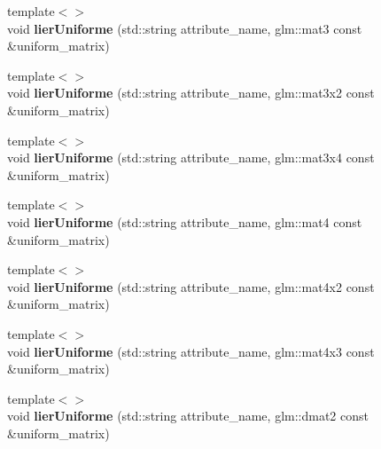 \begin{DoxyCompactItemize}
\item 
\hypertarget{classopengl_1_1_programme_a9fcb45e6142abed238e1e9fb7e4210f8}{{\footnotesize template$<$$>$ }\\void {\bfseries lier\-Uniforme} (std\-::string attribute\-\_\-name, glm\-::mat3 const \&uniform\-\_\-matrix)}\label{classopengl_1_1_programme_a9fcb45e6142abed238e1e9fb7e4210f8}

\item 
\hypertarget{classopengl_1_1_programme_a8399612fa889f320842c5f0460d926e9}{{\footnotesize template$<$$>$ }\\void {\bfseries lier\-Uniforme} (std\-::string attribute\-\_\-name, glm\-::mat3x2 const \&uniform\-\_\-matrix)}\label{classopengl_1_1_programme_a8399612fa889f320842c5f0460d926e9}

\item 
\hypertarget{classopengl_1_1_programme_a5e8909ed134d9bef174142ae95393fbe}{{\footnotesize template$<$$>$ }\\void {\bfseries lier\-Uniforme} (std\-::string attribute\-\_\-name, glm\-::mat3x4 const \&uniform\-\_\-matrix)}\label{classopengl_1_1_programme_a5e8909ed134d9bef174142ae95393fbe}

\item 
\hypertarget{classopengl_1_1_programme_a43efe3f1b27560a42db5360eaaf66fad}{{\footnotesize template$<$$>$ }\\void {\bfseries lier\-Uniforme} (std\-::string attribute\-\_\-name, glm\-::mat4 const \&uniform\-\_\-matrix)}\label{classopengl_1_1_programme_a43efe3f1b27560a42db5360eaaf66fad}

\item 
\hypertarget{classopengl_1_1_programme_a3a80fa0504bcf24af07534f2f516fc39}{{\footnotesize template$<$$>$ }\\void {\bfseries lier\-Uniforme} (std\-::string attribute\-\_\-name, glm\-::mat4x2 const \&uniform\-\_\-matrix)}\label{classopengl_1_1_programme_a3a80fa0504bcf24af07534f2f516fc39}

\item 
\hypertarget{classopengl_1_1_programme_a82a519a15286431c9b8f761c6c43347e}{{\footnotesize template$<$$>$ }\\void {\bfseries lier\-Uniforme} (std\-::string attribute\-\_\-name, glm\-::mat4x3 const \&uniform\-\_\-matrix)}\label{classopengl_1_1_programme_a82a519a15286431c9b8f761c6c43347e}

\item 
\hypertarget{classopengl_1_1_programme_a155dd5cf516378ca8e9690edbbb7b263}{{\footnotesize template$<$$>$ }\\void {\bfseries lier\-Uniforme} (std\-::string attribute\-\_\-name, glm\-::dmat2 const \&uniform\-\_\-matrix)}\label{classopengl_1_1_programme_a155dd5cf516378ca8e9690edbbb7b263}


\end{DoxyCompactItemize}
